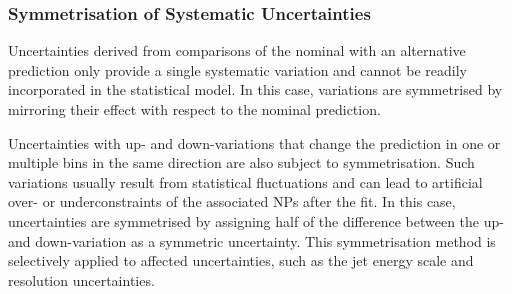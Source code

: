 



\subsubsection{Symmetrisation of Systematic Uncertainties}

Uncertainties derived from comparisons of the nominal with an alternative
prediction only provide a single systematic variation and cannot be readily
incorporated in the statistical model. In this case, variations are symmetrised
by mirroring their effect with respect to the nominal prediction.

Uncertainties with up- and down-variations that change the prediction in one or
multiple bins in the same direction are also subject to symmetrisation. Such
variations usually result from statistical fluctuations and can lead to
artificial over- or underconstraints of the associated NPs after the fit.
In this case, uncertainties are symmetrised by assigning half of the difference
between the up- and down-variation as a symmetric uncertainty. This
symmetrisation method is selectively applied to affected uncertainties, such as
the jet energy scale and resolution uncertainties.


